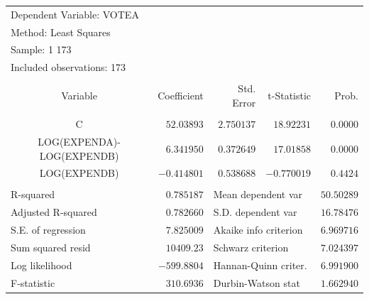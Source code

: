 \documentclass[12pt]{report}
\begin{document}
\begin{table}[H]
	\centering
	\begin{tabular}{lrrrr}
		\multicolumn{3}{l}{Dependent Variable: VOTEA}&\multicolumn{1}{c}{}&\multicolumn{1}{c}{}\\
		\multicolumn{3}{l}{Method: Least Squares}&\multicolumn{1}{c}{}&\multicolumn{1}{c}{}\\
		\multicolumn{2}{l}{Sample: 1 173}&\multicolumn{1}{c}{}&\multicolumn{1}{c}{}&\multicolumn{1}{c}{}\\
		\multicolumn{3}{l}{Included observations: 173}&\multicolumn{1}{c}{}&\multicolumn{1}{c}{}\\
		[4.5pt] \hline \\ [-4.5pt]
		\multicolumn{1}{c}{Variable}&\multicolumn{1}{r}{Coefficient}&\multicolumn{1}{r}{Std. Error}&\multicolumn{1}{r}{t-Statistic}&\multicolumn{1}{r}{Prob.}\\
		[4.5pt] \hline \\ [-4.5pt]
		\multicolumn{1}{c}{C}&\multicolumn{1}{r}{$52.03893$}&\multicolumn{1}{r}{$2.750137$}&\multicolumn{1}{r}{$18.92231$}&\multicolumn{1}{r}{$0.0000$}\\
		\multicolumn{1}{c}{LOG(EXPENDA)-LOG(EXPENDB)}&\multicolumn{1}{r}{$6.341950$}&\multicolumn{1}{r}{$0.372649$}&\multicolumn{1}{r}{$17.01858$}&\multicolumn{1}{r}{$0.0000$}\\
		\multicolumn{1}{c}{LOG(EXPENDB)}&\multicolumn{1}{r}{$-0.414801$}&\multicolumn{1}{r}{$0.538688$}&\multicolumn{1}{r}{$-0.770019$}&\multicolumn{1}{r}{$0.4424$}\\
		[4.5pt] \hline \\ [-4.5pt]
		\multicolumn{1}{l}{R-squared}&\multicolumn{1}{r}{$0.785187$}&\multicolumn{2}{l}{Mean dependent var}&\multicolumn{1}{r}{$50.50289$}\\
		\multicolumn{1}{l}{Adjusted R-squared}&\multicolumn{1}{r}{$0.782660$}&\multicolumn{2}{l}{S.D. dependent var}&\multicolumn{1}{r}{$16.78476$}\\
		\multicolumn{1}{l}{S.E. of regression}&\multicolumn{1}{r}{$7.825009$}&\multicolumn{2}{l}{Akaike info criterion}&\multicolumn{1}{r}{$6.969716$}\\
		\multicolumn{1}{l}{Sum squared resid}&\multicolumn{1}{r}{$10409.23$}&\multicolumn{2}{l}{Schwarz criterion}&\multicolumn{1}{r}{$7.024397$}\\
		\multicolumn{1}{l}{Log likelihood}&\multicolumn{1}{r}{$-599.8804$}&\multicolumn{2}{l}{Hannan-Quinn criter.}&\multicolumn{1}{r}{$6.991900$}\\
		\multicolumn{1}{l}{F-statistic}&\multicolumn{1}{r}{$310.6936$}&\multicolumn{2}{l}{Durbin-Watson stat}&\multicolumn{1}{r}{$1.662940$}\\

\end{tabular}
\end{table}
\end{document}
